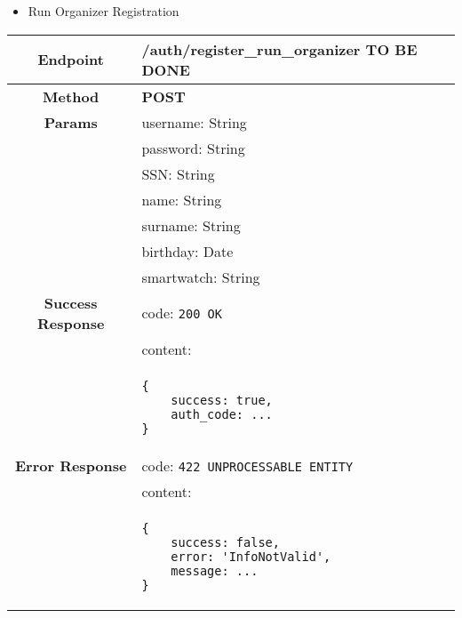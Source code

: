 \begin{itemize}
        \item Run Organizer Registration
    \end{itemize}
    \begin{adjustwidth}{1cm}{}
        \begin{tabular}{|c|l|}
            \hline
            \textbf{Endpoint} & /auth/register\_run\_organizer \textbf{TO BE DONE} \\
            \hline
            \textbf{Method} & \textbf{POST} \\
            \hline
            \textbf{Params} & username: String \\
            &                 password: String \\
            &                 SSN: String \\
            &                 name: String \\
            &                 surname: String \\
            &                 birthday: Date \\
            &                 smartwatch: String \\
            \hline
            \textbf{Success Response} & code: \texttt{200 OK} \\
            &                           content: \\
            & \begin{minipage}[t]{0.5\textwidth}
                \begin{adjustwidth}{1.5cm}{}
                \begin{verbatim}
{
    success: true, 
    auth_code: ...
}
                \end{verbatim}
                \end{adjustwidth}
              \end{minipage} \\
              \hline
            \textbf{Error Response} & code: \texttt{422 UNPROCESSABLE ENTITY} \\
            &                         content: \\
            & \begin{minipage}[t]{0.7\textwidth}
                \begin{adjustwidth}{1.5cm}{}
                \begin{verbatim}
{
    success: false, 
    error: 'InfoNotValid',
    message: ...
}
                \end{verbatim}

\end{adjustwidth}
\end{minipage}
\end{tabular}
\end{adjustwidth}
